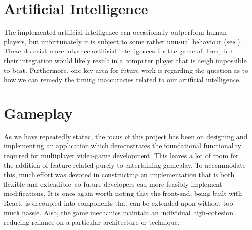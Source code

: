 \documentclass{standalone}
\begin{document}
	\section{Artificial Intelligence}
		The implemented artificial intelligence can occasionally outperform human players, but unfortunately it is subject to some rather unusual behaviour (see ). There do exist more advance artificial intelligences for the game of Tron, but their integration would likely result in a computer player that is neigh impossible to beat. Furthermore, one key area for future work is regarding the question as to how we can remedy the timing inaccuracies related to our artificial intelligence.

	\section{Gameplay}
		As we have repeatedly stated, the focus of this project has been on designing and implementing an application which demonstrates the foundational functionality required for multiplayer video-game development. This leaves a lot of room for the addition of feature related purely to entertaining gameplay. To accommodate this, much effort was devoted in constructing an implementation that is both flexible and extendible, so future developers can more feasibly implement modifications. It is once again worth noting that the front-end, being built with React, is decoupled into components that can be extended upon without too much hassle. Also, the game mechanics maintain an individual high-cohesion; reducing reliance on a particular architecture or technique.
\end{document}

